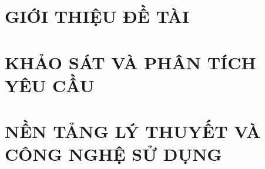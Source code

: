 \documentclass[a4paper,13pt,3p,oneside]{report}
\renewcommand{\headrulewidth}{0pt}
\theoremstyle{definition}
\begin{document}
\renewcommand{\listfigurename}{DANH MỤC HÌNH VẼ}
{\let\oldnumberline\numberline
\renewcommand{\numberline}{Hình~\oldnumberline}
\listoffigures} 
\newpage


\renewcommand{\listtablename}{DANH MỤC BẢNG BIỂU}
{\let\oldnumberline\numberline
\renewcommand{\numberline}{Bảng~\oldnumberline}
\listoftables}

\glsaddall 
 \renewcommand*{\glossaryname}{Danh sách thuật ngữ}
\renewcommand*{\acronymname}{DANH MỤC THUẬT NGỮ VÀ TỪ VIẾT TẮT}
\renewcommand*{\entryname}{Thuật ngữ}
\renewcommand*{\descriptionname}{Ý nghĩa}
\printnoidxglossaries


% 


\newpage
{}

\pagestyle{fancy}
\fancyhf{}
\fancyhead[L]{\ifodd\value{page}\makebox[\headwidth][l]{\small\leftmark}\else\makebox[\headwidth][r]{\small\leftmark}\fi}
\fancyfoot[R]{\thepage}
\renewcommand{\headrulewidth}{0.5pt}

\chapter{GIỚI THIỆU ĐỀ TÀI}
\label{chapter:Introduction}

\newpage
\chapter{KHẢO SÁT VÀ PHÂN TÍCH YÊU CẦU}
\label{chapter:Related_works}



\newpage
\chapter{NỀN TẢNG LÝ THUYẾT VÀ CÔNG NGHỆ SỬ DỤNG}
\label{chapter:Methodology}

\end{document}

